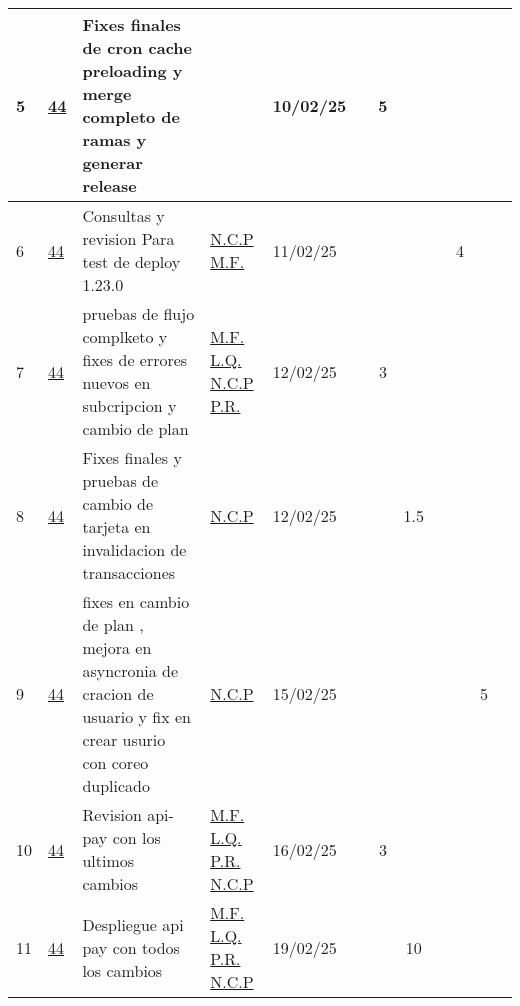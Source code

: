 \documentclass{article}
\begin{document}
\begin{longtable}{|m{0.3cm}|m{1cm}|p{3cm}|m{1.5cm}|m{1.3cm}||c|c|c|c|c|c|c| |}
                 \label{5}5  &  \hyperref[44]{\color{blue}44}  & Fixes finales de cron cache preloading y merge completo de ramas y generar release &  
                 & 10/02/25   &  & 5 &  &  &  &  & \\ \hline 

                 \label{6}6  &  \hyperref[44]{\color{blue}44}  & Consultas y revision Para test de deploy 1.23.0 &  
                  \hyperref[N.C.P]{\color{blue}N.C.P} \newline  \hyperref[M.F.]{\color{blue}M.F.}  & 11/02/25   &  &  &  &  & 4 &  & \\ \hline 

                 \label{7}7  &  \hyperref[44]{\color{blue}44}  & pruebas de flujo complketo y fixes de errores nuevos en subcripcion y cambio de plan &  
                  \hyperref[M.F.]{\color{blue}M.F.} \newline  \hyperref[L.Q.]{\color{blue}L.Q.} \newline  \hyperref[N.C.P]{\color{blue}N.C.P} \newline  \hyperref[P.R.]{\color{blue}P.R.}  & 12/02/25   &  & 3 &  &  &  &  & \\ \hline 

                 \label{8}8  &  \hyperref[44]{\color{blue}44}  & Fixes finales y pruebas de cambio de tarjeta en invalidacion de transacciones &  
                  \hyperref[N.C.P]{\color{blue}N.C.P}  & 12/02/25   &  &  & 1.5 &  &  &  & \\ \hline 

                 \label{9}9  &  \hyperref[44]{\color{blue}44}  & fixes en cambio de plan , mejora en asyncronia de cracion de usuario y fix en crear usurio con coreo duplicado &  
                  \hyperref[N.C.P]{\color{blue}N.C.P}  & 15/02/25   &  &  &  &  &  & 5 & \\ \hline 

                 \label{10}10  &  \hyperref[44]{\color{blue}44}  & Revision api-pay con los ultimos cambios &  
                  \hyperref[M.F.]{\color{blue}M.F.} \newline  \hyperref[L.Q.]{\color{blue}L.Q.} \newline  \hyperref[P.R.]{\color{blue}P.R.} \newline  \hyperref[N.C.P]{\color{blue}N.C.P}  & 16/02/25   &  & 3 &  &  &  &  & \\ \hline 

                 \label{11}11  &  \hyperref[44]{\color{blue}44}  & Despliegue api pay con todos los cambios &  
                  \hyperref[M.F.]{\color{blue}M.F.} \newline  \hyperref[L.Q.]{\color{blue}L.Q.} \newline  \hyperref[P.R.]{\color{blue}P.R.} \newline  \hyperref[N.C.P]{\color{blue}N.C.P}  & 19/02/25   &  &  & 10 &  &  &  & \\ \hline 


\end{longtable}
\end{document}
